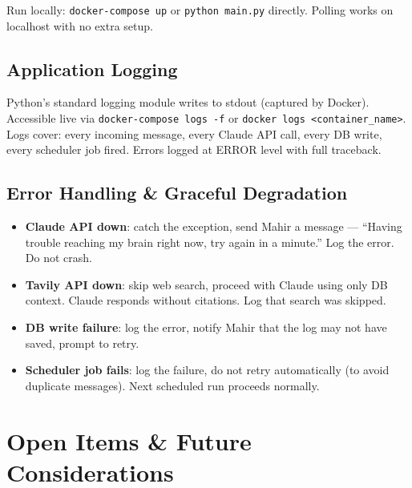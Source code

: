 \documentclass[12pt, a4paper]{article}
\begin{document}
Run locally: \texttt{docker-compose up} or \texttt{python main.py} directly. Polling works on localhost with no extra setup.

\subsection{Application Logging}

Python's standard logging module writes to stdout (captured by Docker). Accessible live via \texttt{docker-compose logs -f} or \texttt{docker logs <container\_name>}. Logs cover: every incoming message, every Claude API call, every DB write, every scheduler job fired. Errors logged at ERROR level with full traceback.

\subsection{Error Handling \& Graceful Degradation}

\begin{itemize}[noitemsep]
    \item \textbf{Claude API down}: catch the exception, send Mahir a message --- ``Having trouble reaching my brain right now, try again in a minute.'' Log the error. Do not crash.
    \item \textbf{Tavily API down}: skip web search, proceed with Claude using only DB context. Claude responds without citations. Log that search was skipped.
    \item \textbf{DB write failure}: log the error, notify Mahir that the log may not have saved, prompt to retry.
    \item \textbf{Scheduler job fails}: log the failure, do not retry automatically (to avoid duplicate messages). Next scheduled run proceeds normally.
\end{itemize}

\section{Open Items \& Future Considerations}
\end{document}
